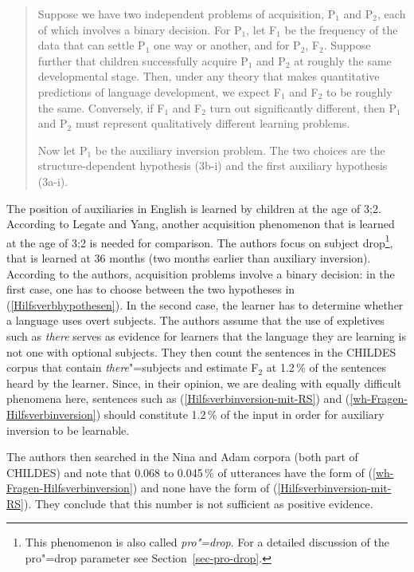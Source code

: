 \begin{quote}
   Suppose we have two independent problems of acquisition, P$_1$ and P$_2$, each
of which involves a binary decision. For P$_1$, let F$_1$ be the frequency of the
data that can settle P$_1$ one way or another, and for P$_2$, F$_2$. Suppose further
that children successfully acquire P$_1$ and P$_2$ at roughly the same developmental
stage. Then, under any theory that makes quantitative predictions of language
development, we expect F$_1$ and F$_2$ to be roughly the same. Conversely, if F$_1$ and
F$_2$ turn out significantly different, then P$_1$ and P$_2$ must represent qualitatively
different learning problems.

   Now let P$_1$ be the auxiliary inversion problem. The two choices are the
structure-dependent hypothesis (3b-i) and the first auxiliary hypothesis (3a-i). \citep[]{LY2002a}
\end{quote}

\noindent
The position of auxiliaries in English is learned by children at the age of 3;2. According to Legate
and Yang, another acquisition phenomenon that is learned at the age of 3;2 is needed for
comparison. The authors focus on subject drop\footnote{%
  This phenomenon is also called \emph{pro"=drop}. For a detailed discussion of the pro"=drop
  parameter see Section~\ref{sec-pro-drop}.
}, that is learned
at 36 months (two months earlier than auxiliary inversion). According to the authors, acquisition problems involve a binary decision:
in the first case, one has to choose between the two hypotheses in (\ref{Hilfsverbhypothesen}). In the second case, the learner has to determine
whether a language uses overt subjects. The authors assume that the use of expletives such as \emph{there} serves as
evidence for learners that the language they are learning is not one with optional subjects. They then count the sentences in the CHILDES corpus
that contain \emph{there}"=subjects and estimate F$_2$ at 1.2\,\% of the sentences heard by the learner.
Since, in their opinion, we are dealing with equally difficult phenomena here, sentences such as (\ref{Hilfsverbinversion-mit-RS}) and (\ref{wh-Fragen-Hilfsverbinversion})
should constitute 1.2\,\% of the input in order for auxiliary inversion to be learnable.

The authors then searched in the Nina and Adam corpora (both part of CHILDES) and note that 0.068 to 0.045\,\% of utterances have the form of
(\ref{wh-Fragen-Hilfsverbinversion}) and none have the form of (\ref{Hilfsverbinversion-mit-RS}). They conclude that this number is not sufficient as positive evidence.

